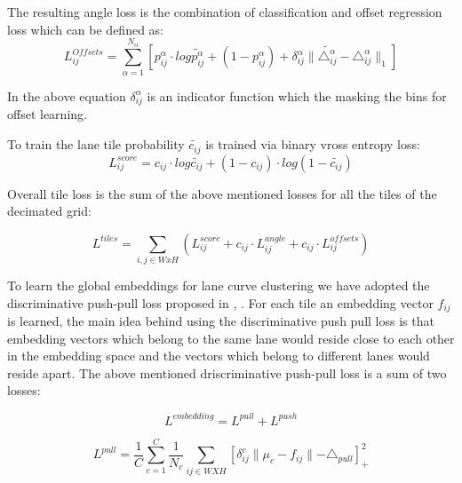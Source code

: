              The resulting angle loss is the combination of classification and offset regression loss which can be defined as:
             \begin{equation}
                 L_{ij}^{Offsets} = \sum_{\alpha=1}^{N_{\alpha}}[p^{\alpha}_{ij} \cdot log \tilde{p^{\alpha}_{ij}} + (1 - p^{\alpha}_{ij}) + \delta^{\alpha}_{ij} \parallel   \tilde{\triangle^{\alpha}_{ij}} - \triangle^{\alpha}_{ij} \parallel_{1} ]
             \end{equation}
             
             In the above equation $\delta^{\alpha}_{ij}$ is an indicator function which the masking the bins for offset learning. 
             
             To train the lane tile probability $\widetilde{c_{ij}}$ is trained via binary vross entropy loss:
             \begin{equation}
                 L_{ij}^{score} = c_{ij} \cdot log \widetilde{c_{ij}} + (1 - c_{ij}) \cdot log
                    (1-  \widetilde{c_{ij}})
             \end{equation}
             
             Overall tile loss is the sum of the above mentioned losses for all the tiles of the decimated grid:
             
            \begin{equation}
                L^{tiles} = \sum_{i,j \in WxH}(L^{score}_{ij} +c_{ij} \cdot L^{angle}_{ij} + c_{ij} \cdot L^{offsets}_{ij}  )
            \end{equation}
            
            To learn the global embeddings for lane curve clustering we have adopted the discriminative push-pull loss proposed in \cite{DBLP:journals/corr/abs-1802-05591} , \cite{DBLP:journals/corr/abs-1708-02551}. For each tile an embedding vector $f_{ij}$ is learned, the main idea behind using the discriminative push pull loss is that embedding vectors which belong to the same lane would reside close to each other in the embedding space and the vectors which belong to different lanes would reside apart. The above mentioned driscriminative push-pull loss is a sum of two losses:
            
            \begin{equation}
                L^{embedding} = L^{pull} + L^{push}
            \end{equation}
             
             \begin{equation}
                     L^{pull} = \frac{1}{C} \sum^{C}_{c=1}\frac{1}{N_{c}} \sum_{ij \in WXH}[ \delta_{ij}^{c} \parallel \mu_{c} - f_{ij}  \parallel - \triangle_{pull} ]_{+}^{2} 
             \end{equation}
             

